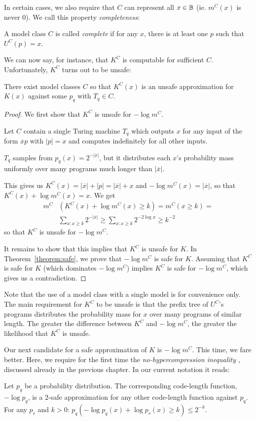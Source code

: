 In certain cases, we also require that $C$ can represent all $x \in {\mathbb B}$ (ie. $m^C(x)$ is never 0). We call this property \emph{completeness}:
\begin{definition}
A model class $C$ is called \emph{complete} if for any $x$, there is at least one $p$ such that $U^C(p) = x$. 
\end{definition}
We can now say, for instance, that $K^C$ is computable for sufficient $C$. Unfortunately, $K^C$ turns out to be unsafe:
\begin{theorem}
There exist model classes $C$ so that $K^C(x)$ is an unsafe approximation for $K(x)$ against some $p_q$ with $T_q \in C$.  \label{theorem:unsafe}
\end{theorem}
\begin{proof}
We first show that $K^C$ is unsafe for $-\log m^C$. 

Let $C$ contain a single Turing machine $T_q$ which outputs $x$ for any input of the form $\overline{x}p$ with $|p| = x$ and computes indefinitely for all other inputs.

$T_q$ samples from $p_q(x) = 2^{-|\overline{x}|}$, but it distributes each $x$'s probability mass uniformly over many programs much longer than $|\overline{x}|$.

This gives us $K^C(x) = |\overline{x}| + |p| = |\overline{x}| + x $ and $-\log m^C(x) = |\overline{x}|$, so that $K^C(x) + \log m^C(x) = x$. We get 
\begin{align*}
m^C&(K^C(x) + \log m^C(x) \geq k) = m^C(x \geq k) = \\
&\sum_{x : x \geq k} 2^{-|\overline{x}|} \geq \sum_{x : x \geq k} 2^{-2 \log x} \geq k^{-2}
\end{align*}
so that $K^C$ is unsafe for $-\log m^C$.

It remains to show that this implies that $K^C$ is unsafe for $K$. In Theorem~\ref{theorem:safe}, we prove that $-\log m^C$ is safe for $K$. Assuming that $K^C$ is safe for $K$ (which dominates $-\log m^C$) implies $K^C$ is safe for $-\log m^C$, which gives us a contradiction.
\end{proof}
Note that the use of a model class with a single model is for convenience only. The main requirement for $K^C$ to be unsafe is that the prefix tree of $U^C$'s programs distributes the probability mass for $x$ over many programs of similar length. The greater the difference between $K^C$ and $- \log m^C$, the greater the likelihood that $K^C$ is unsafe.

Our next candidate for a safe approximation of $K$ is $-\log m^C$. This time, we fare better. Here, we require for the first time the \emph{no-hypercompression inequality} \cite[p103]{grunwald2007minimum}, discussed already in the previous chapter. In our current notation it reads:
\begin{lemma}
Let $p_q$ be a probability distribution. The corresponding code-length function, $-\log p_q$, is a $2$-safe approximation for any other code-length function against $p_q$. For any $p_r$ and $k>0$: $
p_q(-\log p_q(x) +  \log p_r(x) \geq k) \leq 2^{-k}$.
\label{lemma:no-hypercompression}
\end{lemma} 

